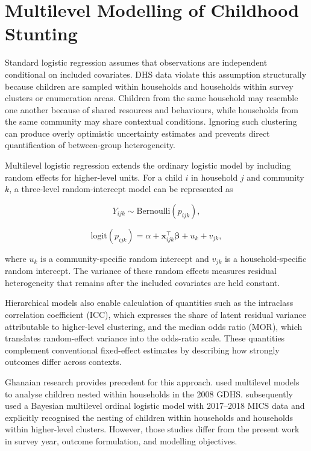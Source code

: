 \section{Multilevel Modelling of Childhood Stunting}

Standard logistic regression assumes that observations are independent conditional on included covariates. DHS data violate this assumption structurally because children are sampled within households and households within survey clusters or enumeration areas. Children from the same household may resemble one another because of shared resources and behaviours, while households from the same community may share contextual conditions. Ignoring such clustering can produce overly optimistic uncertainty estimates and prevents direct quantification of between-group heterogeneity.

Multilevel logistic regression extends the ordinary logistic model by including random effects for higher-level units. For a child $i$ in household $j$ and community $k$, a three-level random-intercept model can be represented as

\begin{equation}
Y_{ijk} \sim \text{Bernoulli}(p_{ijk}),
\end{equation}

\begin{equation}
\text{logit}(p_{ijk}) =
\alpha + \mathbf{x}_{ijk}^{\top}\boldsymbol{\beta}
+ u_k + v_{jk},
\end{equation}

where $u_k$ is a community-specific random intercept and $v_{jk}$ is a household-specific random intercept. The variance of these random effects measures residual heterogeneity that remains after the included covariates are held constant.

Hierarchical models also enable calculation of quantities such as the intraclass correlation coefficient (ICC), which expresses the share of latent residual variance attributable to higher-level clustering, and the median odds ratio (MOR), which translates random-effect variance into the odds-ratio scale. These quantities complement conventional fixed-effect estimates by describing how strongly outcomes differ across contexts.

Ghanaian research provides precedent for this approach. \citet{AhetoEtAl2015} used multilevel models to analyse children nested within households in the 2008 GDHS. \citet{IddrisuGyabaah2023} subsequently used a Bayesian multilevel ordinal logistic model with 2017--2018 MICS data and explicitly recognised the nesting of children within households and households within higher-level clusters. However, those studies differ from the present work in survey year, outcome formulation, and modelling objectives.

